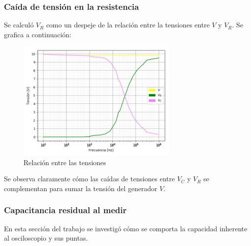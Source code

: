 \documentclass[11pt, a4paper]{article}
\begin{document}
\subsubsection*{Caída de tensión en la resistencia}

Se calculó $V_R$ como un despeje de la relación entre la tensiones entre $V$ y $V_R$. Se grafica a continuación:

\begin{figure}[H]
	\centering
	\includegraphics[width=0.7\textwidth]{Tensiones.png}
	\caption{Relación entre las tensiones} 
	\label{graf:Tensiones}
\end{figure}
Se observa claramente cómo las caídas de tensiones entre $V_C$ y $V_R$ se complementan para sumar la tensión del generador $V$.


\subsubsection*{Capacitancia residual al medir}

En esta sección del trabajo se investigó cómo se comporta la capacidad inherente al osciloscopio y sus puntas. 
\end{document}
